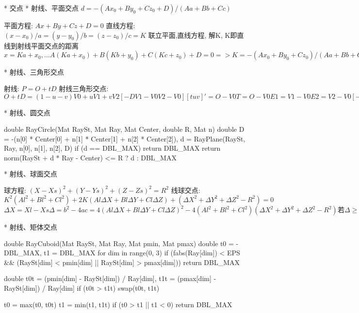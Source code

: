 	* 交点
		* 射线、平面交点
			$
				d = - (A x_0 + B y_0 + C z_0 + D) / (A a + B b + C c)
			$

			\Proof
				平面方程: $A x + B y + C z + D = 0$
				直线方程: $(x - x_0) / a = (y - y_0) / b = (z - z_0) / c = K$
				联立平面,直线方程, 解K, K即直线到射线平面交点的距离
				$
					x = K a + x_0 , ...
					A(K a + x_0) + B(K b + y_0) + C(K c + z_0) + D = 0
					=> K =  - (A x_0 + B y_0 + C z_0) / (A a + B b + C c)
				$

		* 射线、三角形交点

			\Proof
				射线: $P = O + t D$
				射线三角形交点:
				$
						O + t D = (1 - u - v)V0 + u V1 + v V2
						[ -D  V1-V0  V2-V0] [ t  u  v ]' = O - V0
						T = O - V0	E1 = V1 - V0	E2 = V2 - V0
						[ -D  E1  E2 ] [ t  u  v ]' = T
						t = | T  E1  E2| / |-D  E1  E2|
						u = |-D   T  E2| / |-D  E1  E2|
						v = |-D  E1  E2| / |-D  E1  E2|
				(混合积公式): |a  b  c| = a × b·c = -a × c·b
						t = (T × E1·E2) / (D × E2·E1)
						u = (D × E2· T) / (D × E2·E1)
						v = (T × E1· D) / (D × E2·E1)
				$

		* 射线、圆交点

			\Codes
				double RayCircle(Mat RaySt, Mat Ray, Mat Center, double R, Mat n)
					double D = -(n[0] * Center[0] + n[1] * Center[1] + n[2] * Center[2]),
						d = RayPlane(RaySt, Ray, n[0], n[1], n[2], D)
					if (d == DBL_MAX)
						return DBL_MAX
					return norm(RaySt + d * Ray - Center) <= R ? d : DBL_MAX

			* 射线、球面交点

			\Proof
				球方程: $(X - Xs)^2 + (Y - Ys)^2 + (Z - Zs)^2 = R^2$
				线球交点: $K^2(Al^2 + Bl^2 + Cl^2) + 2K(Al ΔX + Bl ΔY + Cl ΔZ) + (ΔX^2 + ΔY^2 + ΔZ^2 - R^2) = 0$
				$
						ΔX = Xl - Xs
						Δ = b^2 - 4ac = 4(Al ΔX + Bl ΔY + Cl ΔZ)^2 - 4(Al^2 + Bl^2 + Cl^2)(ΔX^2 + ΔY^2 + ΔZ^2 - R^2)
						若Δ≥0 有交点.
						K = ( -b ± sqrt(Δ) ) / 2a	即光线走过线距离
				$

		* 射线、矩体交点

			\Codes
				double RayCuboid(Mat RaySt, Mat Ray, Mat pmin, Mat pmax)
					double t0 = -DBL_MAX, t1 = DBL_MAX
					for dim in range(0, 3)
						if (fabs(Ray[dim]) < EPS && (RaySt[dim] < pmin[dim] || RaySt[dim] > pmax[dim])) 
							return DBL_MAX

						double
							t0t = (pmin[dim] - RaySt[dim]) / Ray[dim],
							t1t = (pmax[dim] - RaySt[dim]) / Ray[dim]
						if (t0t > t1t)
							swap(t0t, t1t)

						t0 = max(t0, t0t)
						t1 = min(t1, t1t)
						if (t0 > t1 || t1 < 0)
							return DBL_MAX

